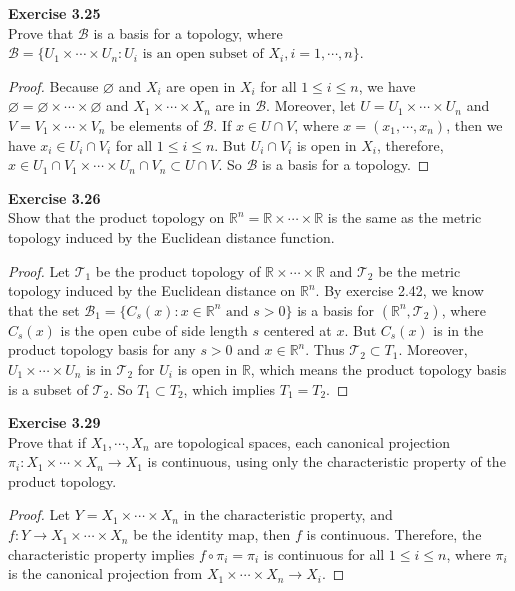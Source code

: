 \documentclass[12pt, a4paper]{article}
\theoremstyle{plain}
\newcommand{\B}{\mathscr{B}}
\newcommand{\R}{\mathbb{R}}
\newcommand{\T}{\mathcal{T}}
\newenvironment{exercise}[2][Exercise]
    { \begin{mdframed}[backgroundcolor=gray!20] \textbf{#1 #2} \\}
    {  \end{mdframed}}
\begin{document}
\begin{exercise}{3.25}
Prove that $\B$ is a basis for a topology, where $\B=\{U_1\times\cdots\times U_n:U_i \text{ is an open subset of } X_i,i=1,\cdots ,n\}$.
\end{exercise}
	\begin{proof}
	Because $\varnothing$ and $X_i$ are open in $X_i$ for all $1\leq i\leq n$, we have $\varnothing=\varnothing\times\cdots\times \varnothing$ and $X_1\times\cdots\times X_n$ are in $\B$. Moreover, let $U = U_1\times \cdots \times U_n$ and $V=V_1\times\cdots\times V_n$ be elements of $\B$. If $x\in U\cap V$, where $x=(x_1,\cdots,x_n)$, then we have $x_i\in U_i\cap V_i$ for all $1\leq i\leq n$. But $U_i\cap V_i$ is open in $X_i$, therefore, $x\in U_1\cap V_1\times\cdots\times U_n\cap V_n\subset U\cap V$. So $\B$ is a basis for a topology.
	\end{proof}		
	
\begin{exercise}{3.26}
Show that the product topology on $\R^n=\R\times\cdots\times\R$ is the same as the metric topology induced by the Euclidean distance function.
\end{exercise}
	\begin{proof}
	Let $\T_1$ be the product topology of $\R\times\cdots\times\R$ and $\T_2$ be the metric topology induced by the Euclidean distance on $\R^n$. By exercise 2.42, we know that the set $\B_1=\{C_s(x):x\in\R^n \text{ and } s>0\}$ is a basis for $(\R^n,\T_2)$, where $C_s(x)$ is the open cube of side length $s$ centered at $x$. But $C_s(x)$ is in the product topology basis for any $s>0$ and $x\in \R^n$. Thus $\T_2\subset T_1$. Moreover, $U_1\times\cdots\times U_n$ is in $\T_2$ for $U_i$ is open in $\R$, which means the product topology basis is a subset of $\T_2$. So $T_1\subset T_2$, which implies $T_1=T_2$.						
	\end{proof}

\begin{exercise}{3.29}
Prove that if $X_1,\cdots,X_n$ are topological spaces, each canonical projection $\pi_i:X_1\times\cdots\times X_n\rightarrow X_1$ is continuous, using only the characteristic property of the product topology.
\end{exercise}
	\begin{proof}
	Let $Y=X_1\times\cdots\times X_n$ in the characteristic property, and $f:Y\rightarrow X_1\times\cdots\times X_n$ be the identity map, then $f$ is continuous. Therefore, the characteristic property implies $f\circ \pi_i = \pi_i$ is continuous for all $1\leq i\leq n$, where $\pi_i$ is the canonical projection from $X_1\times\cdots\times X_n\rightarrow X_i$.
	\end{proof}
\end{document}
